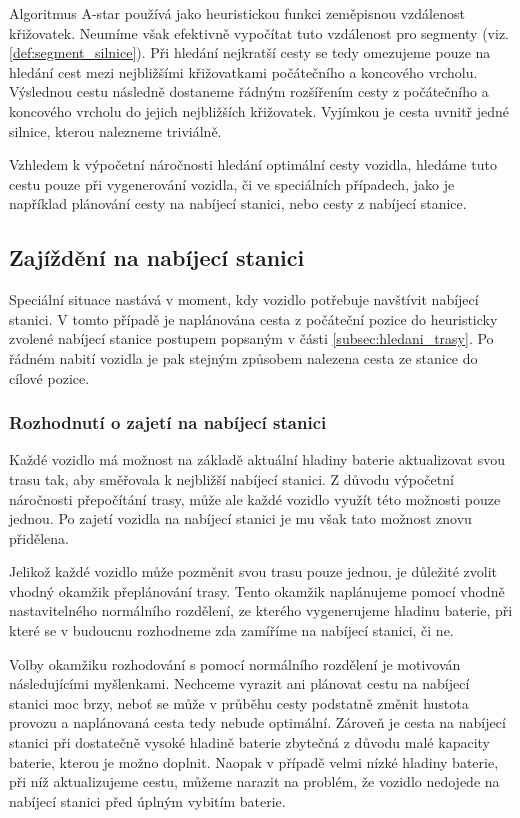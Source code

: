 Algoritmus A-star používá jako heuristickou funkci zeměpisnou vzdálenost křižovatek. 
Neumíme však efektivně vypočítat tuto vzdálenost pro segmenty 
(viz. \cref{def:segment_silnice}). Při hledání nejkratší cesty se tedy omezujeme
pouze na hledání cest mezi nejbližšími křižovatkami počátečního a koncového vrcholu.
Výslednou cestu následně dostaneme řádným rozšířením cesty z počátečního a koncového
vrcholu do jejich nejbližších křižovatek. Vyjímkou je cesta uvnitř jedné silnice, kterou
nalezneme triviálně.

Vzhledem k výpočetní náročnosti hledání optimální cesty vozidla, hledáme tuto cestu
pouze při vygenerování vozidla, či ve speciálních případech, jako je například
plánování cesty na nabíjecí stanici, nebo cesty z nabíjecí stanice.


\subsection{Zajíždění na nabíjecí stanici}
\label{subsec:zajizdeni_na_nabijecku}

Speciální situace nastává v moment, kdy vozidlo potřebuje navštívit nabíjecí stanici.
V tomto případě je naplánována cesta z počáteční pozice do heuristicky zvolené
nabíjecí stanice postupem popsaným v části \cref{subsec:hledani_trasy}.
Po řádném nabití vozidla je pak stejným způsobem nalezena cesta ze stanice do
cílové pozice.

\subsubsection{Rozhodnutí o zajetí na nabíjecí stanici}

Každé vozidlo má možnost na základě aktuální hladiny baterie aktualizovat 
svou trasu tak, aby směřovala k nejbližší nabíjecí stanici. 
Z důvodu výpočetní náročnosti přepočítání trasy, může ale každé vozidlo
využít této možnosti pouze jednou. Po zajetí vozidla na nabíjecí stanici je mu
však tato možnost znovu přidělena.

Jelikož každé vozidlo může pozměnit svou trasu pouze jednou, je důležité zvolit
vhodný okamžik přeplánování trasy. Tento okamžik naplánujeme pomocí vhodně 
nastavitelného normálního rozdělení, ze kterého vygenerujeme hladinu baterie,
při které se v budoucnu rozhodneme zda zamíříme na nabíjecí stanici, či ne.

Volby okamžiku rozhodování s pomocí normálního rozdělení je motivován následujícími
myšlenkami. Nechceme vyrazit ani plánovat cestu na nabíjecí stanici moc brzy, neboť se 
může v průběhu cesty podstatně změnit hustota provozu a naplánovaná cesta
tedy nebude optimální. Zároveň je cesta na nabíjecí stanici při dostatečně vysoké 
hladině baterie zbytečná z důvodu malé kapacity baterie, kterou je možno doplnit.
Naopak v případě velmi nízké hladiny baterie, při níž aktualizujeme cestu, můžeme
narazit na problém, že vozidlo nedojede na nabíjecí stanici před úplným vybitím baterie.

